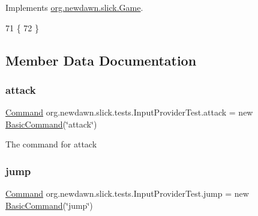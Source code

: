 Implements \mbox{\hyperlink{interfaceorg_1_1newdawn_1_1slick_1_1_game_ab07b2e9463ee4631620dde0de25bdee8}{org.\+newdawn.\+slick.\+Game}}.


\begin{DoxyCode}
71                                                            \{
72     \}
\end{DoxyCode}


\subsection{Member Data Documentation}
\mbox{\label{classorg_1_1newdawn_1_1slick_1_1tests_1_1_input_provider_test_a8a624395dae059c0cfaab284f7d69eda}} 
\subsubsection{\texorpdfstring{attack}{attack}}
{\footnotesize\ttfamily \mbox{\hyperlink{interfaceorg_1_1newdawn_1_1slick_1_1command_1_1_command}{Command}} org.\+newdawn.\+slick.\+tests.\+Input\+Provider\+Test.\+attack = new \mbox{\hyperlink{classorg_1_1newdawn_1_1slick_1_1command_1_1_basic_command}{Basic\+Command}}(\char`\"{}attack\char`\"{})\hspace{0.3cm}{\ttfamily [private]}}

The command for attack \mbox{\label{classorg_1_1newdawn_1_1slick_1_1tests_1_1_input_provider_test_a173ff3b9a22623008ac6eea7d6ab07a3}} 
\subsubsection{\texorpdfstring{jump}{jump}}
{\footnotesize\ttfamily \mbox{\hyperlink{interfaceorg_1_1newdawn_1_1slick_1_1command_1_1_command}{Command}} org.\+newdawn.\+slick.\+tests.\+Input\+Provider\+Test.\+jump = new \mbox{\hyperlink{classorg_1_1newdawn_1_1slick_1_1command_1_1_basic_command}{Basic\+Command}}(\char`\"{}jump\char`\"{})\hspace{0.3cm}{\ttfamily [private]}}

